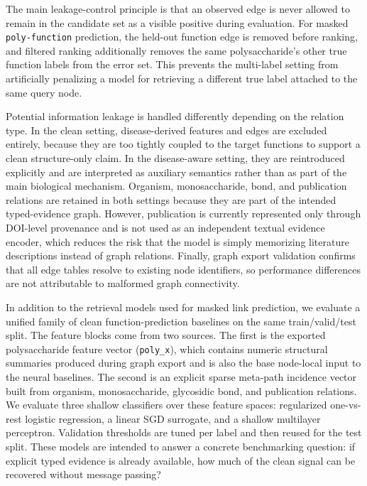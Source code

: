 \documentclass[11pt]{article}
\begin{document}
The main leakage-control principle is that an observed edge is never allowed to remain in the candidate set as a visible positive during evaluation. For masked \texttt{poly-function} prediction, the held-out function edge is removed before ranking, and filtered ranking additionally removes the same polysaccharide's other true function labels from the error set. This prevents the multi-label setting from artificially penalizing a model for retrieving a different true label attached to the same query node.

Potential information leakage is handled differently depending on the relation type. In the clean setting, disease-derived features and edges are excluded entirely, because they are too tightly coupled to the target functions to support a clean structure-only claim. In the disease-aware setting, they are reintroduced explicitly and are interpreted as auxiliary semantics rather than as part of the main biological mechanism. Organism, monosaccharide, bond, and publication relations are retained in both settings because they are part of the intended typed-evidence graph. However, publication is currently represented only through DOI-level provenance and is not used as an independent textual evidence encoder, which reduces the risk that the model is simply memorizing literature descriptions instead of graph relations. Finally, graph export validation confirms that all edge tables resolve to existing node identifiers, so performance differences are not attributable to malformed graph connectivity.

In addition to the retrieval models used for masked link prediction, we evaluate a unified family of clean function-prediction baselines on the same train/valid/test split. The feature blocks come from two sources. The first is the exported polysaccharide feature vector (\texttt{poly\_x}), which contains numeric structural summaries produced during graph export and is also the base node-local input to the neural baselines. The second is an explicit sparse meta-path incidence vector built from organism, monosaccharide, glycosidic bond, and publication relations. We evaluate three shallow classifiers over these feature spaces: regularized one-vs-rest logistic regression, a linear SGD surrogate, and a shallow multilayer perceptron. Validation thresholds are tuned per label and then reused for the test split. These models are intended to answer a concrete benchmarking question: if explicit typed evidence is already available, how much of the clean signal can be recovered without message passing?
\end{document}
